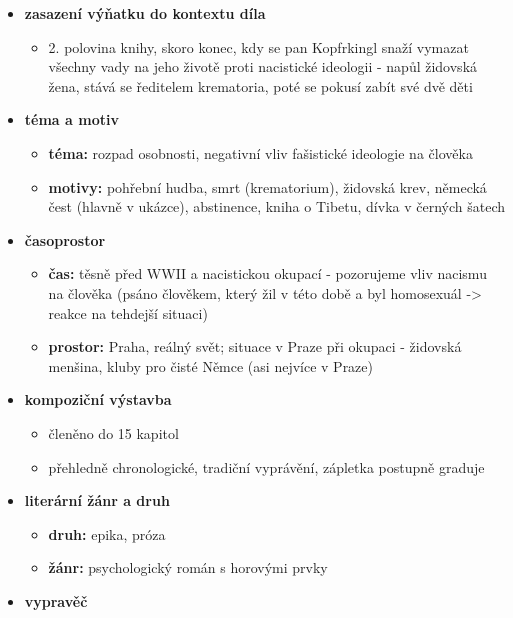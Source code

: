 \documentclass[11pt]{article}
\begin{document}
    \begin{itemize}
        \item\textbf{zasazení výňatku do kontextu díla}
        \begin{itemize}
            \item 2. polovina knihy, skoro konec, kdy se pan Kopfrkingl snaží vymazat všechny vady na jeho životě proti nacistické ideologii - napůl židovská žena, stává se ředitelem krematoria, poté se pokusí zabít své dvě děti
        \end{itemize}
        \item\textbf{téma a motiv}
        \begin{itemize}
            \item \textbf{téma: }rozpad osobnosti, negativní vliv fašistické ideologie na člověka
            \item \textbf{motivy: }pohřební hudba, smrt (krematorium), židovská krev, německá čest (hlavně v ukázce), abstinence, kniha o Tibetu, dívka v černých šatech
        \end{itemize}
        \item\textbf{časoprostor}
        \begin{itemize}
            \item \textbf{čas: }těsně před WWII a nacistickou okupací - pozorujeme vliv nacismu na člověka (psáno člověkem, který žil v této době a byl homosexuál -> reakce na tehdejší situaci)
            \item \textbf{prostor: }Praha, reálný svět; situace v Praze při okupaci - židovská menšina, kluby pro čisté Němce (asi nejvíce v Praze)
        \end{itemize}
        \item\textbf{kompoziční výstavba}
        \begin{itemize}
            \item členěno do 15 kapitol
            \item přehledně chronologické, tradiční vyprávění, zápletka postupně graduje
        \end{itemize}
        \item\textbf{literární žánr a druh}
        \begin{itemize}
            \item\textbf{druh: }epika, próza
            \item\textbf{žánr: }psychologický román s horovými prvky
        \end{itemize}
        \item\textbf{vypravěč}

\end{itemize}
\end{document}
